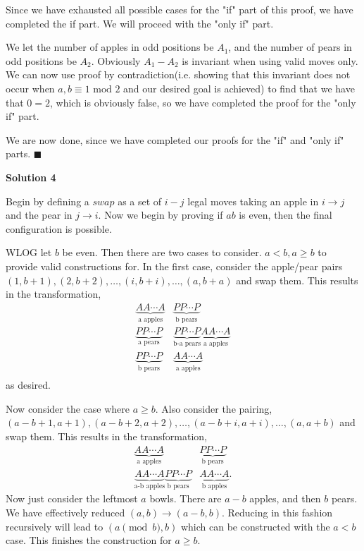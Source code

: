 \begin{enumerate}
 Since we have exhausted all possible cases for the "if" part of this proof, we have completed the if part. We will proceed with the "only if" part. 

 We let the number of apples in odd positions be $A_1$, and the number of pears in odd positions be $A_2$. Obviously $A_1-A_2$ is invariant when using valid moves only. We can now use proof by contradiction(i.e. showing that this invariant does not occur when $a, b \equiv 1 \text{ mod } 2$ and our desired goal is achieved) to find that we have that $0=2$, which is obviously false, so we have completed the proof for the "only if" part. 

 We are now done, since we have completed our proofs for the "if" and "only if" parts. $\blacksquare$




\textbf{Solution 4}

Begin by defining a $\textit{swap}$ as a set of $i - j$ legal moves taking an apple in $i \rightarrow j$ and the pear in $j \rightarrow i$. Now we begin by proving if $ab$ is even, then the final configuration is possible.

 WLOG let $b$ be even. Then there are two cases to consider. $a < b, a \ge b$ to provide valid constructions for. In the first case, consider the apple/pear pairs $(1,b+1), (2, b+2), \dots, (i, b+i), \dots, (a, b+a)$ and swap them. This results in the transformation, 
 \begin{align*} \underbrace{AA \cdots A}_{\text{a apples}}& \underbrace{PP \cdots P}_{\text{b pears}} \\ \underbrace{PP \cdots P}_{\text{a pears}}& \underbrace{PP \cdots P}_{\text{b-a pears}} \underbrace{AA \cdots A}_{\text{a apples}}  \\ \underbrace{PP \cdots P}_{\text{b pears}} &\underbrace{AA \cdots A}_{\text{a apples}}  \\ \end{align*}
as desired.

 Now consider the case where $a \ge b$. Also consider the pairing, $(a-b + 1, a + 1), (a - b + 2, a+2), \dots, (a - b + i, a+i), \dots, (a, a + b)$ and swap them. This results in the transformation, 
 \begin{align*} \underbrace{AA \cdots A}_{\text{a apples}} & \underbrace{PP \cdots P}_{\text{b pears}} \\ \underbrace{AA \cdots A}_{\text{a-b apples}}\underbrace{PP \cdots P}_{\text{b pears}}& \underbrace{AA \cdots A}_{\text{b apples}}. \end{align*}
Now just consider the leftmost $a$ bowls. There are $a-b$ apples, and then $b$ pears. We have effectively reduced $(a,b) \rightarrow (a-b, b)$. Reducing in this fashion recursively will lead to $(a \pmod{b}, b)$ which can be constructed with the $a<b$ case. This finishes the construction for $a \ge b$.


\end{enumerate}
